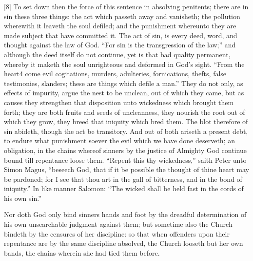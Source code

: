 [8] To set down then the force of this sentence in absolving penitents; there are in sin these three things: the act which passeth away and vanisheth; the pollution wherewith it leaveth the soul defiled; and the punishment whereunto they are made subject that have committed it. The act of sin, is every deed, word, and thought against the law of God. “For sin is the transgression of the law;” and although the deed itself do not continue, yet is that bad quality permanent, whereby it maketh the soul unrighteous and deformed in God’s sight. “From the heart4 come evil cogitations, murders, adulteries, fornications, thefts, false testimonies, slanders; these are things which defile a man.” They do not only, as effects of impurity, argue the nest to be unclean, out of which they came, but as causes they strengthen that disposition unto wickedness which brought them forth; they are both fruits and seeds of uncleanness, they nourish the root out of which they grow, they breed that iniquity which bred them. The blot therefore of sin abideth, though the act be transitory. And out of both ariseth a present debt, to endure what punishment soever the evil which we have done deserveth;  an obligation, in the chains whereof sinners by the justice of Almighty God continue bound till repentance loose them. “Repent this thy wickedness,” saith Peter unto Simon Magus, “beseech God, that if it be possible the thought of thine heart may be pardoned; for I see that thou art in the gall of bitterness, and in the bond of iniquity.” In like manner Salomon: “The wicked shall be held fast in the cords of his own sin.”

Nor doth God only bind sinners hands and foot by the dreadful determination of his own unsearchable judgment against them; but sometime also the Church bindeth by the censures of her discipline: so that when offenders upon their repentance are by the same discipline absolved, the Church looseth but her own bands, the chains wherein she had tied them before.

